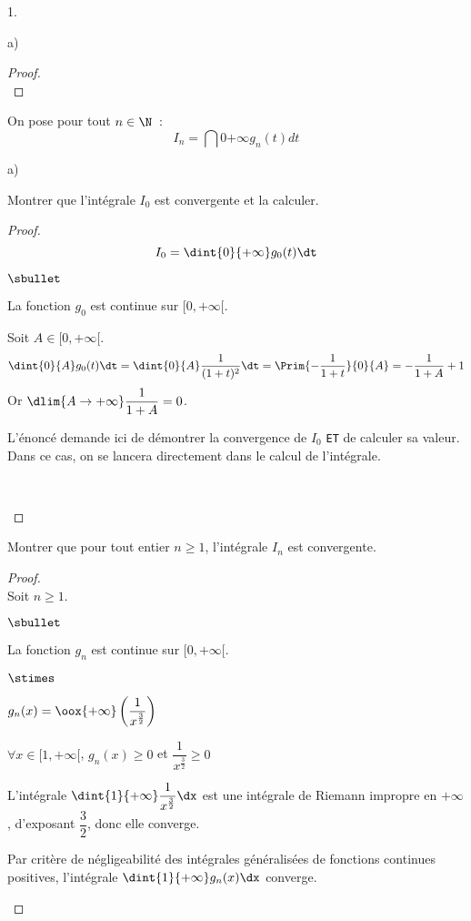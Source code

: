 \documentclass[11pt]{article}%
\begin{document}
\begin{noliste}{1.}
\begin{noliste}{a)}
\begin{proof}
 ~\\[-1cm]
\end{proof}
\end{noliste}


\item On pose pour tout $n \in \N$~:
\[ 
I_n = \dint{0}{+\infty} g_n(t) dt 
\]
\begin{noliste}{a)}
\item Montrer que l'intégrale $I_0$ est convergente et la calculer.

\begin{proof}~
 \[
  I_0=\dint{0}{+\infty} g_0(t)\dt
 \]
 \begin{noliste}{$\sbullet$}
  \item La fonction $g_0$ est continue sur $[0,+\infty[$.
  
  \item Soit $A \in [0,+\infty[$.
  \[
   \dint{0}{A} g_0(t) \dt =
   \dint{0}{A} \dfrac{1}{(1+t)^2} \dt = \Prim{-\dfrac{1}{1+t}}{0}{A}
   =-\dfrac{1}{1+A} +1
  \]
  Or $\dlim{A\to+\infty} \dfrac{1}{1+A} =0$.
  
  \begin{remark}
   L'énoncé demande ici de démontrer la convergence de $I_0$ 
   \texttt{ET} de calculer sa valeur.\\
   Dans ce cas, on se lancera directement dans le calcul de l'intégrale.
  \end{remark}~\\[-1.4cm]
 \end{noliste}
\end{proof}


\newpage


\item Montrer que pour tout entier $n \geq 1$, l'intégrale $I_n$ 
est convergente.

\begin{proof}~\\
Soit $n\geq 1$.
 \begin{noliste}{$\sbullet$}
  \item La fonction $g_n$ est continue sur $[0,+\infty[$.
  
  \item
  \begin{noliste}{$\stimes$}
    \item $g_n(x) = \oox{+\infty} 
    \left(\dfrac{1}{x^{\frac{3}{2}}}\right)$
    \item $\forall x \in [1,+\infty[$, $g_n(x)\geq 0$ et 
    $\dfrac{1}{x^{\frac{3}{2}}}\geq 0$
    \item L'intégrale $\dint{1}{+\infty} \dfrac{1}{x^{\frac{3}{2}}}\dx$ 
    est une intégrale de Riemann impropre en $+\infty$, d'exposant 
    $\dfrac{3}{2}$, donc elle converge.
  \end{noliste}
  Par critère de négligeabilité des intégrales généralisées de 
  fonctions continues positives, l'intégrale
  $\dint{1}{+\infty} g_n(x) \dx$ converge.
  

\end{noliste}
\end{proof}
\end{noliste}
\end{noliste}
\end{document}
